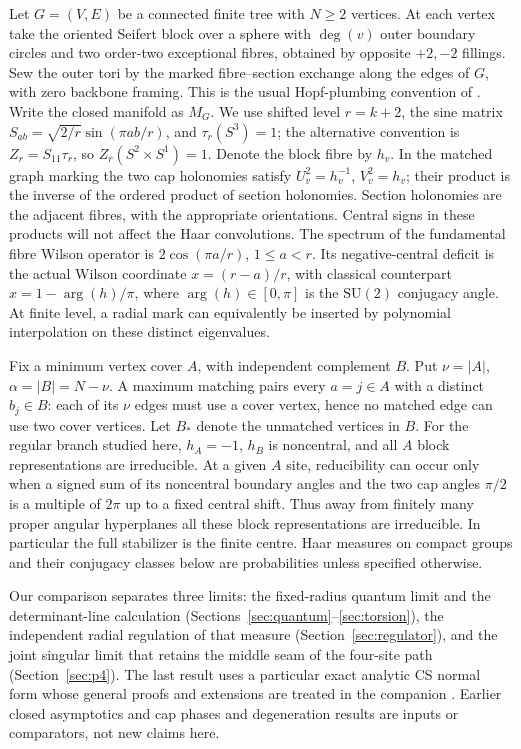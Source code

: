 \documentclass[11pt]{article}
\newcommand{\SU}{\mathrm{SU}(2)}
\begin{document}
Let \(G=(V,E)\) be a connected finite tree with \(N\ge2\) vertices. At each vertex take the oriented Seifert block over a sphere with \(\deg(v)\) outer boundary circles and two order-two exceptional fibres, obtained by opposite \(+2,-2\) fillings. Sew the outer tori by the marked fibre--section exchange along the edges of \(G\), with zero backbone framing. This is the usual Hopf-plumbing convention of \cite{GPPV,P48}. Write the closed manifold as \(M_G\). We use shifted level \(r=k+2\), the sine matrix \(S_{ab}=\sqrt{2/r}\sin(\pi ab/r)\), and \(\tau_r(S^3)=1\); the alternative convention is \(Z_r=S_{11}\tau_r\), so \(Z_r(S^2\times S^1)=1\). Denote the block fibre by \(h_v\). In the matched graph marking the two cap holonomies satisfy \(U_v^2=h_v^{-1}\), \(V_v^2=h_v\); their product is the inverse of the ordered product of section holonomies. Section holonomies are the adjacent fibres, with the appropriate orientations. Central signs in these products will not affect the Haar convolutions. The spectrum of the fundamental fibre Wilson operator is \(2\cos(\pi a/r)\), \(1\le a<r\). Its negative-central deficit is the actual Wilson coordinate \(x=(r-a)/r\), with classical counterpart \(x=1-\arg(h)/\pi\), where \(\arg(h)\in[0,\pi]\) is the \(\SU\) conjugacy angle. At finite level, a radial mark can equivalently be inserted by polynomial interpolation on these distinct eigenvalues.

Fix a minimum vertex cover \(A\), with independent complement \(B\). Put \(\nu=|A|\), \(\alpha=|B|=N-\nu\). A maximum matching pairs every \(a=j\in A\) with a distinct \(b_j\in B\): each of its \(\nu\) edges must use a cover vertex, hence no matched edge can use two cover vertices. Let \(B_*\) denote the unmatched vertices in \(B\). For the regular branch studied here, \(h_A=-1\), \(h_B\) is noncentral, and all \(A\) block representations are irreducible. At a given \(A\) site, reducibility can occur only when a signed sum of its noncentral boundary angles and the two cap angles \(\pi/2\) is a multiple of \(2\pi\) up to a fixed central shift. Thus away from finitely many proper angular hyperplanes all these block representations are irreducible. In particular the full stabilizer is the finite centre. Haar measures on compact groups and their conjugacy classes below are probabilities unless specified otherwise.

Our comparison separates three limits: the fixed-radius quantum limit and the determinant-line calculation (Sections~\ref{sec:quantum}--\ref{sec:torsion}), the independent radial regulation of that measure (Section~\ref{sec:regulator}), and the joint singular limit that retains the middle seam of the four-site path (Section~\ref{sec:p4}). The last result uses a particular exact analytic CS normal form whose general proofs and extensions are treated in the companion \cite{CSNF}. Earlier closed asymptotics \cite{P48} and cap phases and degeneration results \cite{P49} are inputs or comparators, not new claims here.
\end{document}
